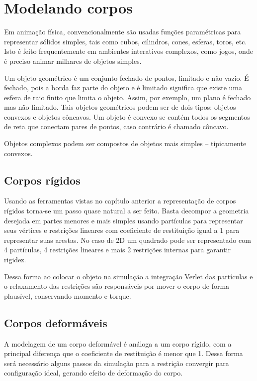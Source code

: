 \chapter{Modelando corpos}

Em animação física, convencionalmente são usadas funções paramétricas para representar sólidos simples, tais como cubos, cilindros, cones, esferas, toros, etc. Isto é feito frequentemente em ambientes interativos complexos, como jogos, onde é preciso animar milhares de objetos simples.

Um objeto geométrico é um conjunto fechado de pontos, limitado e não vazio. É fechado, pois a borda faz parte do objeto e é limitado significa que existe uma esfera de raio finito que limita o objeto. Assim, por exemplo, um plano é fechado mas não limitado. Tais objetos geométricos podem ser de dois tipos: objetos convexos e objetos côncavos. Um objeto é convexo se contém todos os segmentos de reta que conectam pares de pontos, caso contrário é chamado côncavo. 

Objetos complexos podem ser compostos de objetos mais simples – tipicamente convexos.

\section{Corpos rígidos}

Usando as ferramentas vistas no capítulo anterior a representação de corpos rígidos torna-se um passo quase natural a ser feito. Basta decompor a geometria desejada em partes menores e mais simples usando partículas para representar seus vértices e restrições lineares com coeficiente de restituição igual a 1 para representar suas arestas. No caso de 2D um quadrado pode ser representado com 4 partículas, 4 restrições lineares e mais 2 restrições internas para garantir rigidez.

Dessa forma ao colocar o objeto na simulação a integração Verlet das partículas e o relaxamento das restrições são responsáveis por mover o corpo de forma plausível, conservando momento e torque.

\section{Corpos deformáveis}

A modelagem de um corpo deformável é análoga a um corpo rígido, com a principal diferença que o coeficiente de restituição é menor que 1. Dessa forma será necessário alguns passos da simulação para a restrição convergir para configuração ideal, gerando efeito de deformação do corpo.

